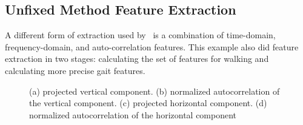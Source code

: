 \documentclass{sig-alternate}
\begin{document}
\subsection{Unfixed Method Feature Extraction}
	A different form of extraction used by~\cite{Lu:2014} is a combination of time-domain, frequency-domain, and auto-correlation features. This example also did feature extraction in two stages: calculating the set of features for walking and calculating more precise gait features. 
\begin{figure}
\centering
{}
\caption{(a) projected vertical component. (b) normalized autocorrelation of the vertical component. (c) projected horizontal component. (d) normalized autocorrelation of the horizontal component}
\label{fig:TD1}
\end{figure}
\end{document}
